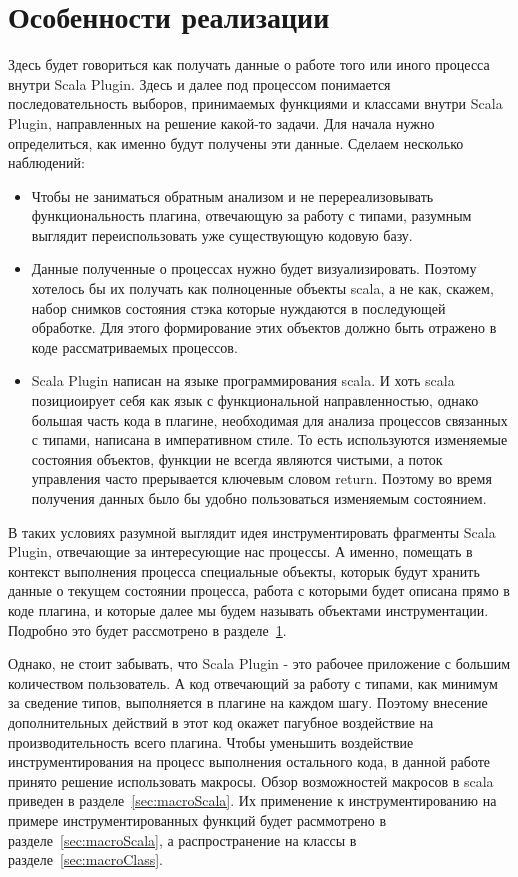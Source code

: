 \section{Особенности реализации}
\label{sec:instrumentation}
Здесь будет говориться как получать данные о работе того или иного процесса
внутри Scala Plugin.
Здесь и далее под процессом понимается последовательность выборов, принимаемых функциями и
классами внутри Scala Plugin, направленных на решение какой-то задачи.
Для начала нужно определиться, как именно будут получены эти данные.
Сделаем несколько наблюдений:

\begin{itemize}
  \item Чтобы не заниматься обратным анализом и не перереализовывать функциональность плагина,
  отвечающую за работу с типами, разумным выглядит переиспользовать уже существующую кодовую базу.
  \item Данные полученные о процессах нужно будет визуализировать.
  Поэтому хотелось бы их получать как полноценные объекты scala, а не как, скажем,
  набор снимков состояния стэка которые нуждаются в последующей обработке.
  Для этого формирование этих объектов должно быть отражено в коде рассматриваемых процессов.
  \item Scala Plugin написан на языке программирования scala.
  И хоть scala позициоирует себя как язык с функциональной направленностью,
  однако большая часть кода в плагине, необходимая для анализа процессов связанных с типами,
  написана в императивном стиле.
  То есть используются изменяемые состояния объектов, функции не всегда являются чистыми,
  а поток управления часто прерывается ключевым словом return.
  Поэтому во время получения данных было бы удобно пользоваться изменяемым состоянием.
\end{itemize}

В таких условиях разумной выглядит идея инструментировать фрагменты Scala Plugin,
отвечающие за интересующие нас процессы.
А именно, помещать в контекст выполнения процесса специальные объекты,
которык будут хранить данные о текущем состоянии процесса,
работа с которыми будет описана прямо в коде плагина, и которые
далее мы будем называть объектами инструментации.
Подробно это будет рассмотрено в разделе~\ref{sec:instrumentation}.

Однако, не стоит забывать, что Scala Plugin - это рабочее приложение
с большим количеством пользователь.
А код отвечающий за работу с типами, как минимум за сведение типов,
выполняется в плагине на каждом шагу.
Поэтому внесение дополнительных действий в этот код окажет пагубное воздействие
на производительность всего плагина.
Чтобы уменьшить воздействие инструментирования на процесс выполнения остального кода,
в данной работе принято решение использовать макросы.
Обзор возможностей макросов в scala приведен в разделе~\ref{sec:macroScala}.
Их применение к инструментированию на примере инструментированных функций
будет расммотрено в разделе~\ref{sec:macroScala}, а распространение на классы
в разделе~\ref{sec:macroClass}.

